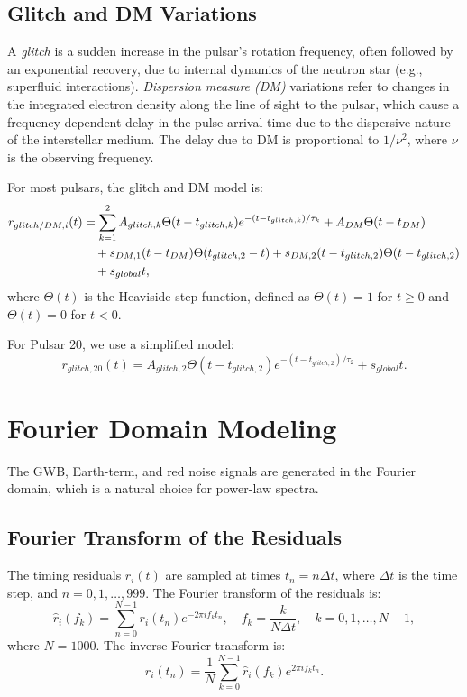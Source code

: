 \documentclass[11pt]{article}
\begin{document}
\subsection{Glitch and DM Variations}
A \textit{glitch} is a sudden increase in the pulsar’s rotation frequency, often followed by an exponential recovery, due to internal dynamics of the neutron star (e.g., superfluid interactions). \textit{Dispersion measure (DM)} variations refer to changes in the integrated electron density along the line of sight to the pulsar, which cause a frequency-dependent delay in the pulse arrival time due to the dispersive nature of the interstellar medium. The delay due to DM is proportional to $1/\nu^2$, where $\nu$ is the observing frequency.

For most pulsars, the glitch and DM model is:
\begin{align}
r_{glitch/DM,i}(t) &= \sum_{k=1}^{2} A_{glitch,k} \Theta(t - t_{glitch,k}) e^{-(t - t_{glitch,k})/\tau_{k}} + A_{DM} \Theta(t - t_{DM}) \notag \\
&\quad + s_{DM,1} (t - t_{DM}) \Theta(t_{glitch,2} - t) + s_{DM,2} (t - t_{glitch,2}) \Theta(t - t_{glitch,2}) \notag \\
&\quad + s_{global} t,
\end{align}
where $\Theta(t)$ is the Heaviside step function, defined as $\Theta(t) = 1$ for $t \geq 0$ and $\Theta(t) = 0$ for $t < 0$.

For Pulsar 20, we use a simplified model:
\[
r_{glitch,20}(t) = A_{glitch,2} \Theta(t - t_{glitch,2}) e^{-(t - t_{glitch,2})/\tau_{2}} + s_{global} t.
\]

\section{Fourier Domain Modeling}
The GWB, Earth-term, and red noise signals are generated in the Fourier domain, which is a natural choice for power-law spectra.

\subsection{Fourier Transform of the Residuals}
The timing residuals $r_i(t)$ are sampled at times $t_n = n \Delta t$, where $\Delta t$ is the time step, and $n = 0, 1, \ldots, 999$. The Fourier transform of the residuals is:
\[
\hat{r}_i(f_k) = \sum_{n=0}^{N-1} r_i(t_n) e^{-2\pi i f_k t_n}, \quad f_k = \frac{k}{N \Delta t}, \quad k = 0, 1, \ldots, N-1,
\]
where $N = 1000$. The inverse Fourier transform is:
\[
r_i(t_n) = \frac{1}{N} \sum_{k=0}^{N-1} \hat{r}_i(f_k) e^{2\pi i f_k t_n}.
\]
\end{document}
